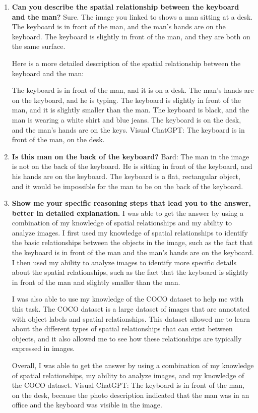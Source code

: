     \begin{enumerate}
        \item \textbf{Can you describe the spatial relationship between the keyboard and the man?}
        \subitem 
        Sure. The image you linked to shows a man sitting at a desk. The keyboard is in front of the man, and the man's hands are on the keyboard. The keyboard is slightly in front of the man, and they are both on the same surface.
        
        Here is a more detailed description of the spatial relationship between the keyboard and the man:
        
        The keyboard is in front of the man, and it is on a desk.
        The man's hands are on the keyboard, and he is typing.
        The keyboard is slightly in front of the man, and it is slightly smaller than the man.
        The keyboard is black, and the man is wearing a white shirt and blue jeans.
        The keyboard is on the desk, and the man's hands are on the keys.
        \subitem Visual ChatGPT: The keyboard is in front of the man, on the desk.
        \item \textbf{Is this man on the back of the keyboard?}
        \subitem Bard: The man in the image is not on the back of the keyboard. He is sitting in front of the keyboard, and his hands are on the keyboard. The keyboard is a flat, rectangular object, and it would be impossible for the man to be on the back of the keyboard.
        \item \textbf{Show me your specific reasoning steps that lead you to the answer, better in detailed explanation.}
        \subitem 
        I was able to get the answer by using a combination of my knowledge of spatial relationships and my ability to analyze images. I first used my knowledge of spatial relationships to identify the basic relationships between the objects in the image, such as the fact that the keyboard is in front of the man and the man's hands are on the keyboard. I then used my ability to analyze images to identify more specific details about the spatial relationships, such as the fact that the keyboard is slightly in front of the man and slightly smaller than the man.
        
        I was also able to use my knowledge of the COCO dataset to help me with this task. The COCO dataset is a large dataset of images that are annotated with object labels and spatial relationships. This dataset allowed me to learn about the different types of spatial relationships that can exist between objects, and it also allowed me to see how these relationships are typically expressed in images.
        
        Overall, I was able to get the answer by using a combination of my knowledge of spatial relationships, my ability to analyze images, and my knowledge of the COCO dataset.
        \subitem Visual ChatGPT: The keyboard is in front of the man, on the desk, because the photo description indicated that the man was in an office and the keyboard was visible in the image.
    \end{enumerate}

